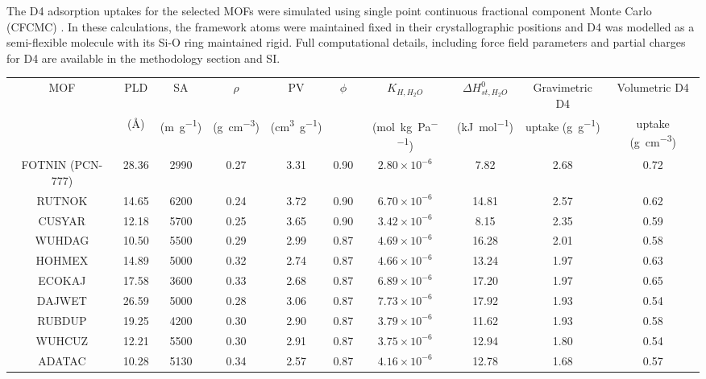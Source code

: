 The D4 adsorption uptakes for the selected MOFs were simulated using single
point continuous fractional component Monte Carlo (CFCMC)
\citep{rahbariRecentAdvancesContinuous2020}. In these calculations, the
framework atoms were maintained fixed in their crystallographic positions and D4
was modelled as a semi-flexible molecule with its Si-O ring maintained rigid.
Full computational details, including force field parameters and partial charges
for D4 are available in the methodology section and SI.

\begin{widetable}[htb]
    \centering\small
    \caption{%
        Top 10 promising hydrophobic MOF materials identified for D4 uptake at \SI{298}{\kelvin}.
    }\label{tbl:top10}
    \begin{tabular}{@{}cccccccccc@{}}
        \toprule
        MOF & PLD & SA & \(\rho\) & PV & \(\phi\) & \(K_{H,H_{2}O}\) & \(\Delta H_{st,H_{2}O}^{0}\) &
        Gravimetric D4 & Volumetric D4 \\

        & (Å) & (\si{\metre\per\gram}) & (\si{\gram\per\centi\metre\cubed}) & (\si{\centi\metre\cubed\per\gram}) & 
        & (\si{\mol\per\kilo\gram\per\pascal}) & (\si{\kilo\joule\per\mol}) & uptake (\si{\gram\per\gram}) & uptake (\si{\gram\per\centi\metre\cubed}) \\
        \midrule
        FOTNIN (PCN-777) & 28.36 & 2990 & 0.27 & 3.31 & 0.90 & \(2.80\times10^{-6}\) & 7.82 & 2.68 & 0.72\\
        RUTNOK & 14.65 & 6200 & 0.24 & 3.72 & 0.90 & \(6.70\times10^{-6}\) & 14.81 & 2.57 & 0.62\\
        CUSYAR & 12.18 & 5700 & 0.25 & 3.65 & 0.90 & \(3.42\times10^{-6}\) & 8.15 & 2.35 & 0.59\\
        WUHDAG & 10.50 & 5500 & 0.29 & 2.99 & 0.87 & \(4.69\times10^{-6}\) & 16.28 & 2.01 & 0.58\\
        HOHMEX & 14.89 & 5000 & 0.32 & 2.74 & 0.87 & \(4.66\times10^{-6}\) & 13.24 & 1.97 & 0.63\\
        ECOKAJ & 17.58 & 3600 & 0.33 & 2.68 & 0.87 & \(6.89\times10^{-6}\) & 17.20 & 1.97 & 0.65\\
        DAJWET & 26.59 & 5000 & 0.28 & 3.06 & 0.87 & \(7.73\times10^{-6}\) & 17.92 & 1.93 & 0.54\\
        RUBDUP & 19.25 & 4200 & 0.30 & 2.90 & 0.87 & \(3.79\times10^{-6}\) & 11.62 & 1.93 & 0.58\\
        WUHCUZ & 12.21 & 5500 & 0.30 & 2.91 & 0.87 & \(3.75\times10^{-6}\) & 12.94 & 1.80 & 0.54\\
        ADATAC & 10.28 & 5130 & 0.34 & 2.57 & 0.87 & \(4.16\times10^{-6}\) & 12.78 & 1.68 & 0.57\\
        \bottomrule
    \end{tabular}
\end{widetable}


